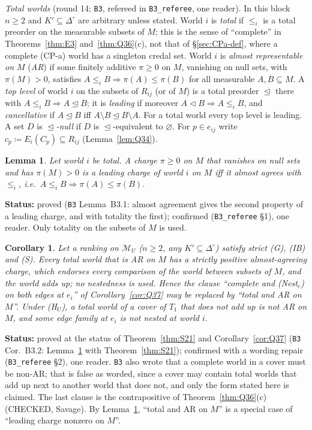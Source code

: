 \documentclass[11pt]{article}
\newtheorem{lemma}[theorem]{Lemma}
\newtheorem{corollary}[theorem]{Corollary}
\theoremstyle{definition}
\theoremstyle{remark}
\newcommand{\Di}{\Delta^{\circ}}
\newcommand{\M}{\mathcal M}
\newcommand{\src}[1]{\texttt{#1}}
\newcommand{\status}[1]{\par\smallskip\noindent\textbf{Status:} #1\par\smallskip}
\begin{document}
\emph{Total worlds} (round 14; \src{B3}, refereed in \src{B3\_referee}, one reader). In this block $n\ge2$ and $K'\subseteq\Di$ are arbitrary unless stated. World $i$ is \emph{total} if $\le_i$ is a total preorder on the measurable subsets of $M$; this is the sense of ``complete'' in Theorems~\ref{thm:E3} and~\ref{thm:Q36}(c), not that of \S\ref{sec:CPa-def}, where a complete (CP-a) world has a singleton credal set. World $i$ is \emph{almost representable on $M$} (\emph{AR}) if some finitely additive $\pi\ge0$ on $M$, vanishing on null sets, with $\pi(M)>0$, satisfies $A\le_iB\Rightarrow\pi(A)\le\pi(B)$ for all measurable $A,B\subseteq M$. A \emph{top level} of world $i$ on the subsets of $R_{ij}$ (or of $M$) is a total preorder $\trianglelefteq$ there with $A\le_iB\Rightarrow A\trianglelefteq B$; it is \emph{leading} if moreover $A\vartriangleleft B\Rightarrow A\le_iB$, and \emph{cancellative} if $A\trianglelefteq B$ iff $A\setminus B\trianglelefteq B\setminus A$. For a total world every top level is leading. A set $D$ is \emph{$\trianglelefteq$-null} if $D$ is $\trianglelefteq$-equivalent to $\varnothing$. For $p\in e_{ij}$ write $c_p\coloneqq E_i(C_p)\subseteq R_{ij}$ (Lemma~\ref{lem:Q34}).

\begin{lemma}\label{lem:B31}
Let world $i$ be total. A charge $\pi\ge0$ on $M$ that vanishes on null sets and has $\pi(M)>0$ is a leading charge of world $i$ on $M$ iff it almost agrees with $\le_i$, i.e.\ $A\le_iB\Rightarrow\pi(A)\le\pi(B)$.
\end{lemma}
\status{proved (\src{B3} Lemma~B3.1: almost agreement gives the second property of a leading charge, and with totality the first); confirmed (\src{B3\_referee} \S1), one reader. Only totality on the subsets of $M$ is used.}

\begin{corollary}\label{cor:B32}
Let a ranking on $\M_U$ ($n\ge2$, any $K'\subseteq\Di$) satisfy strict (G), (IB) and (S). Every total world that is AR on $M$ has a strictly positive almost-agreeing charge, which endorses every comparison of the world between subsets of $M$, and the world adds up; no nestedness is used. Hence the clause ``complete and (Nest$_e$) on both edges at $e_i$'' of Corollary~\ref{cor:Q37} may be replaced by ``total and AR on $M$''. Under (H$_U$), a total world of a cover of $T_1$ that does not add up is not AR on $M$, and some edge family at $e_i$ is not nested at world $i$.
\end{corollary}
\status{proved at the status of Theorem~\ref{thm:S21} and Corollary~\ref{cor:Q37} (\src{B3} Cor.~B3.2: Lemma~\ref{lem:B31} with Theorem~\ref{thm:S21}); confirmed with a wording repair (\src{B3\_referee} \S2), one reader. \src{B3} also wrote that a complete world in a cover must be non-AR; that is false as worded, since a cover may contain total worlds that add up next to another world that does not, and only the form stated here is claimed. The last clause is the contrapositive of Theorem~\ref{thm:Q36}(c) (CHECKED, Savage). By Lemma~\ref{lem:B31}, ``total and AR on $M$'' is a special case of ``leading charge nonzero on $M$''.}
\end{document}
